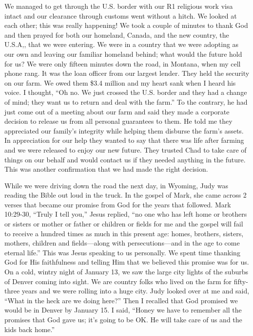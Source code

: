\documentclass[twoside, 12pt]{book}
\begin{document}
We managed to get through the U.S. border with our R1 religious work visa intact and our clearance through customs went without a hitch. We looked at each other; this was really happening! We took a couple of minutes to thank God and then prayed for both our homeland, Canada, and the new country, the U.S.A,, that we were entering.  We were in a country that we were adopting as our own and leaving our familiar homeland behind; what would the future hold for us? We were only fifteen minutes down the road, in Montana, when my cell phone rang. It was the loan officer from our largest lender. They held the security on our farm. We owed them \$3.4 million and my heart sank when I heard his voice. I thought, “Oh no. We just crossed the U.S. border and they had a change of mind; they want us to return and deal with the farm.” To the contrary, he had just come out of a meeting about our farm and said they made a corporate decision to release us from all personal guarantees to them. He told me they appreciated our family’s integrity while helping them disburse the farm’s assets. In appreciation for our help they wanted to say that there was life after farming and we were released to enjoy our new future. They trusted Chad to take care of things on our behalf and would contact us if they needed anything in the future. This was another confirmation that we had made the right decision.

While we were driving down the road the next day, in Wyoming, Judy was reading the Bible out loud in the truck. In the gospel of Mark, she came across 2 verses that became our promise from God for the years that followed. Mark 10:29-30, “Truly I tell you,” Jesus replied, “no one who has left home or brothers or sisters or mother or father or children or fields for me and the gospel will fail to receive a hundred times as much in this present age: homes, brothers, sisters, mothers, children and fields—along with persecutions—and in the age to come eternal life.” This was Jesus speaking to us personally. We spent time thanking God for His faithfulness and telling Him that we  believed this promise was for us. On a cold, wintry night of January 13, we saw the large city lights of the suburbs of Denver coming into sight. We are country folks who lived on the farm for fifty-three years and we were rolling into a huge city. Judy looked over at me and said, “What in the heck are we doing here?” Then I recalled that God promised we would be in Denver by January 15. I said, “Honey we have to remember all the promises that God gave us; it’s going to be OK. He will take care of us and the kids back home.”  
\end{document}
